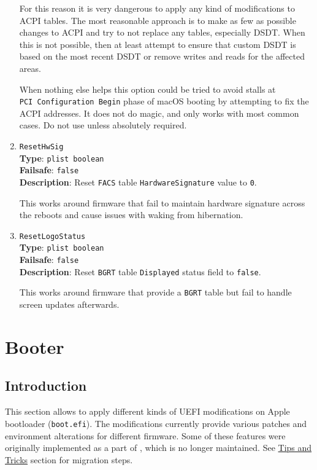 \documentclass[]{article}
\begin{document}
\begin{enumerate}
  For this reason it is very dangerous to apply any kind of
  modifications to ACPI tables. The most reasonable approach is to make
  as few as possible changes to ACPI and try to not replace any tables,
  especially DSDT. When this is not possible, then at least attempt to
  ensure that custom DSDT is based on the most recent DSDT or remove
  writes and reads for the affected areas.

  When nothing else helps this option could be tried to avoid stalls at
  \texttt{PCI\ Configuration\ Begin} phase of macOS booting by
  attempting to fix the ACPI addresses. It does not do magic, and only
  works with most common cases. Do not use unless absolutely required.

\item
  \texttt{ResetHwSig}\\
  \textbf{Type}: \texttt{plist\ boolean}\\
  \textbf{Failsafe}: \texttt{false}\\
  \textbf{Description}: Reset \texttt{FACS} table \texttt{HardwareSignature}
  value to \texttt{0}.

  This works around firmware that fail to maintain hardware signature across
  the reboots and cause issues with waking from hibernation.

\item
  \texttt{ResetLogoStatus}\\
  \textbf{Type}: \texttt{plist\ boolean}\\
  \textbf{Failsafe}: \texttt{false}\\
  \textbf{Description}: Reset \texttt{BGRT} table \texttt{Displayed}
  status field to \texttt{false}.

  This works around firmware that provide a \texttt{BGRT} table but
  fail to handle screen updates afterwards.

\end{enumerate}


\section{Booter}\label{booter}

\subsection{Introduction}\label{booterintro}

This section allows to apply different kinds of UEFI modifications on
Apple bootloader (\texttt{boot.efi}). The modifications currently provide
various patches and environment alterations for different firmware. Some
of these features were originally implemented as a part of
\href{https://github.com/acidanthera/AptioFixPkg}{},
which is no longer maintained. See \hyperref[troubleshootingtricks]{Tips and Tricks}
section for migration steps.
\end{document}
